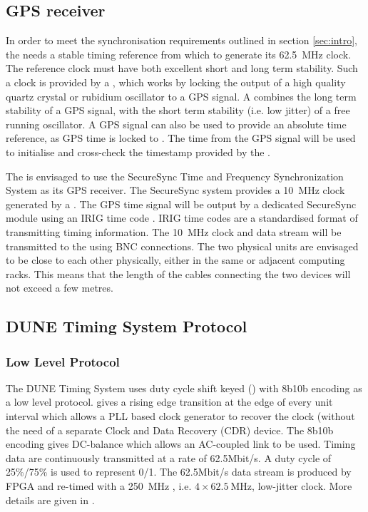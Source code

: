 \documentclass{dune}
\begin{document}
\subsection{GPS receiver}
In order to meet the synchronisation requirements outlined in section \ref{sec:intro}, the  needs a stable timing reference from which to generate its \SI{62.5}{\MHz} clock. The reference clock must have both excellent short and long term stability. Such a clock is provided by a , which works by locking the output of a high quality quartz crystal or rubidium oscillator to a GPS signal. A  combines the long term stability of a GPS signal, with the short term stability (i.e. low jitter) of a free running oscillator. A GPS signal can also be used to provide an absolute time reference, as GPS time is locked to . The time from the GPS signal will be used to initialise and cross-check the timestamp provided by the .

The  is envisaged to use the SecureSync Time and Frequency Synchronization System \cite{secure_sync_datasheet} as its GPS receiver. The SecureSync system provides a \SI{10}{\MHz} clock generated by a . The GPS time signal will be output by a dedicated SecureSync module \cite{secure_sync_modules} using an IRIG time code \cite{irig}. IRIG time codes are a standardised format of transmitting timing information. The \SI{10}{\MHz} clock and  data stream will be transmitted to the  using BNC connections. The two physical units are envisaged to be close to each other physically, either in the same or adjacent computing racks. This means that the length of the cables connecting the two devices will not exceed a few metres.

\subsection{DUNE Timing System Protocol}

\subsubsection{Low Level Protocol}

The DUNE Timing System uses duty cycle shift keyed () with 8b10b encoding as a low level protocol.   gives a rising edge transition at the edge of every unit interval which allows a PLL based clock generator to recover the clock (without the need of a separate Clock and Data Recovery (CDR) device. The 8b10b encoding gives DC-balance which allows an AC-coupled link to be used. Timing data are continuously transmitted at a rate of 62.5Mbit/s. A duty cycle of 25\%/75\% is used to represent 0/1. The 62.5Mbit/s data stream is produced by FPGA and re-timed with a \SI{250}{MHz} , i.e. $4 \times \SI{62.5}{\MHz}$, low-jitter clock. More details are given in \cite{2210.15517}. 
\end{document}
